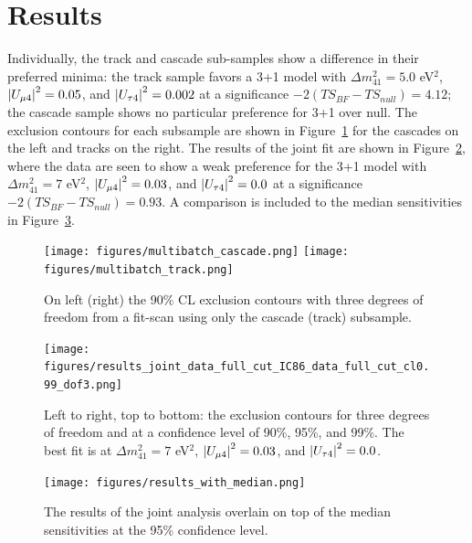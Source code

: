 \documentclass[main.tex]{subfiles}
\begin{document}
\section{Results}

Individually, the track and cascade sub-samples show a difference in their preferred minima: the track sample favors a 3+1 model with $\Delta m_{41}^{2}=5.0$ eV$^{2}$, $\left| U_{\mu 4} \right|^{2}=0.05$, and $\left| U_{\tau 4} \right|^{2}=0.002$ at a significance $-2\left(TS_{BF} - TS_{null}\right)=4.12$; the cascade sample shows no particular preference for 3+1 over null.
The exclusion contours for each subsample are shown in Figure~\ref{fig:results_separate} for the cascades on the left and tracks on the right. 
The results of the joint fit are shown in Figure~\ref{fig:final_results}, where the data are seen to show a weak preference for the 3+1 model with $\Delta m_{41}^{2}=7$ eV$^{2}$, $\left| U_{\mu 4} \right|^{2}=0.03$, and $\left| U_{\tau 4} \right|^{2}=0.0$ at a significance $-2\left(TS_{BF} - TS_{null}\right)=0.93$. 
A comparison is included to the median sensitivities in Figure~\ref{fig:final_results_median}.

\begin{figure}
    \centering
    \texttt{[image: figures/multibatch\_cascade.png]}%
    \texttt{[image: figures/multibatch\_track.png]}
    \caption{On left (right) the 90\% CL exclusion contours with three degrees of freedom from a fit-scan using only the cascade (track) subsample.}\label{fig:results_separate}
\end{figure}

\begin{figure}
    \centering
    \texttt{[image: figures/results\_joint\_data\_full\_cut\_IC86\_data\_full\_cut\_cl0.99\_dof3.png]}
    \caption{Left to right, top to bottom: the exclusion contours for three degrees of freedom and at a confidence level of 90\%, 95\%, and 99\%. The best fit is at $\Delta m_{41}^{2}=7$ eV$^{2}$, $\left| U_{\mu 4} \right|^{2}=0.03$, and $\left| U_{\tau 4} \right|^{2}=0.0$.}\label{fig:final_results}
\end{figure}

\begin{figure}
    \centering
    \texttt{[image: figures/results\_with\_median.png]}
    \caption{The results of the joint analysis overlain on top of the median sensitivities at the 95\% confidence level.}\label{fig:final_results_median}
\end{figure}
\end{document}

